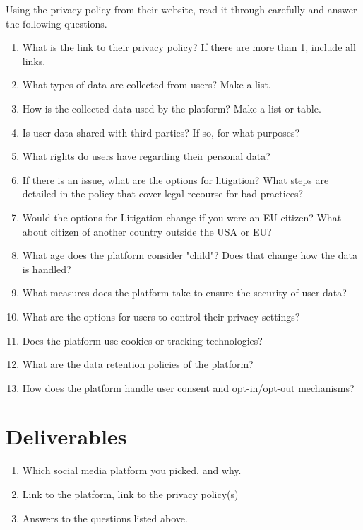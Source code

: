 \documentclass[12pt]{article}
\begin{document}
        

Using the privacy policy from their website, read it through carefully and answer the following questions.
            \begin{enumerate}
                \item What is the link to their privacy policy? If there are more than 1, include all links.
                \item What types of data are collected from users?  Make a list.
                \item How is the collected data used by the platform?  Make a list or table.
                \item Is user data shared with third parties? If so, for what purposes?
                \item What rights do users have regarding their personal data?
                \item If there is an issue, what are the options for litigation? What steps are detailed in the policy that cover legal recourse for bad practices?
                \item Would the options for Litigation change if you were an EU citizen? What about citizen of another country outside the USA or EU?
                \item What age does the platform consider "child"? Does that change how the data is handled?
                \item What measures does the platform take to ensure the security of user data?
                \item What are the options for users to control their privacy settings?
                \item Does the platform use cookies or tracking technologies?
                \item What are the data retention policies of the platform?
                \item How does the platform handle user consent and opt-in/opt-out mechanisms?
        \end{enumerate}


\section*{Deliverables}

\begin{enumerate}
    \item Which social media platform you picked, and why.
    \item Link to the platform, link to the privacy policy(s)
    \item Answers to the questions listed above.

\end{enumerate}
\end{document}
